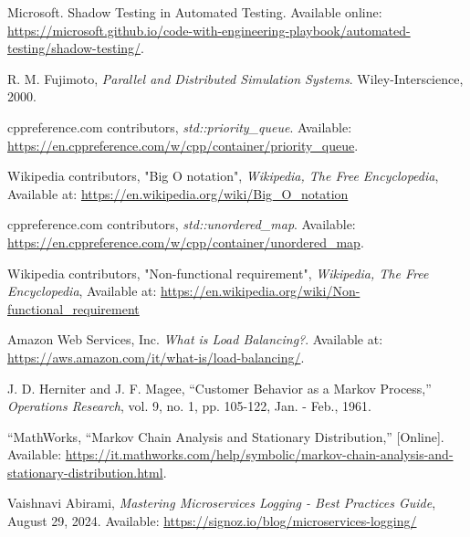 \documentclass[oneside]{sapthesis}%
\begin{document}
\begin{thebibliography}{17}

Microsoft. Shadow Testing in Automated Testing. Available online: \url{https://microsoft.github.io/code-with-engineering-playbook/automated-testing/shadow-testing/}.

    R. M. Fujimoto, \textit{Parallel and Distributed Simulation Systems}. Wiley-Interscience, 2000.

cppreference.com contributors, 
\emph{std::priority\_queue}. 
Available: \url{https://en.cppreference.com/w/cpp/container/priority_queue}.

Wikipedia contributors, "Big O notation", \textit{Wikipedia, The Free Encyclopedia}, Available at: \url{https://en.wikipedia.org/wiki/Big_O_notation}

cppreference.com contributors, 
\emph{std::unordered\_map}. 
Available: \url{https://en.cppreference.com/w/cpp/container/unordered_map}.

Wikipedia contributors, "Non-functional requirement", \textit{Wikipedia, The Free Encyclopedia}, Available at: 
\url{https://en.wikipedia.org/wiki/Non-functional_requirement}

Amazon Web Services, Inc. \textit{What is Load Balancing?}. Available at: \url{https://aws.amazon.com/it/what-is/load-balancing/}.

J. D. Herniter and J. F. Magee, ``Customer Behavior as a Markov Process,'' \textit{Operations Research}, vol. 9, no. 1, pp. 105-122, Jan. - Feb., 1961.

``MathWorks, ``Markov Chain Analysis and Stationary Distribution,'' [Online]. Available: \url{https://it.mathworks.com/help/symbolic/markov-chain-analysis-and-stationary-distribution.html}.

Vaishnavi Abirami,
\textit{Mastering Microservices Logging - Best Practices Guide},
August 29, 2024. Available: \url{https://signoz.io/blog/microservices-logging/}


\end{thebibliography}
\end{document}
